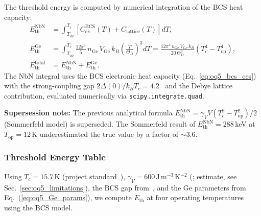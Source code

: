 The threshold energy is computed by numerical integration of the
BCS heat capacity:
\begin{align}
  E_\mathrm{th}^\mathrm{NbN}
    &= \int_{T_\mathrm{op}}^{T_c}
       \left[C_{es}^\mathrm{BCS}(T) + C_\mathrm{lattice}(T)\right] dT,
  \label{eq:oq5_E_th_NbN} \\[4pt]
  E_\mathrm{th}^\mathrm{Ge}
    &= \int_{T_\mathrm{op}}^{T_c}
       \frac{12\pi^4}{5}\,n_\mathrm{Ge}\,V_\mathrm{Ge}\,k_B
       \left(\frac{T}{\Theta_D}\right)^3 dT
     = \frac{12\pi^4\,n_\mathrm{Ge}\,V_\mathrm{Ge}\,k_B}
            {20\,\Theta_D^3}
       \left(T_c^4 - T_\mathrm{op}^4\right),
  \label{eq:oq5_E_th_Ge} \\[4pt]
  E_\mathrm{th}^\mathrm{total}
    &= E_\mathrm{th}^\mathrm{NbN} + E_\mathrm{th}^\mathrm{Ge}.
  \label{eq:oq5_E_th_total}
\end{align}
The NbN integral uses the BCS electronic heat capacity
(Eq.~\ref{eq:oq5_bcs_ces}) with the strong-coupling gap
$2\Delta(0)/k_BT_c = 4.2$~\cite{Kamlapure2010} %
and the Debye lattice contribution, evaluated numerically
via \texttt{scipy.integrate.quad}.

\textbf{Supersession note:} The previous analytical formula
$E_\mathrm{th}^\mathrm{NbN} = \gamma_V V (T_c^2 - T_\mathrm{op}^2)/2$
(Sommerfeld model) is superseded. The Sommerfeld result of
$E_\mathrm{th}^\mathrm{NbN} = 288$\,keV at $T_\mathrm{op} = 12$\,K
underestimated the true value by a factor of $\sim\!3.6$.

\subsubsection{Threshold Energy Table}

Using $T_c = 15.7$\,K (project
standard~\cite{Kamlapure2010}), %
$\gamma_V = 600$\,J\,m$^{-3}$\,K$^{-2}$
(; estimate, see
Sec.~\ref{sec:oq5_limitations}),
the BCS gap from~\cite{Kamlapure2010}, %
and the Ge parameters from Eq.~(\ref{eq:oq5_Ge_params}), we compute
$E_\mathrm{th}$ at four operating temperatures using the BCS model.

